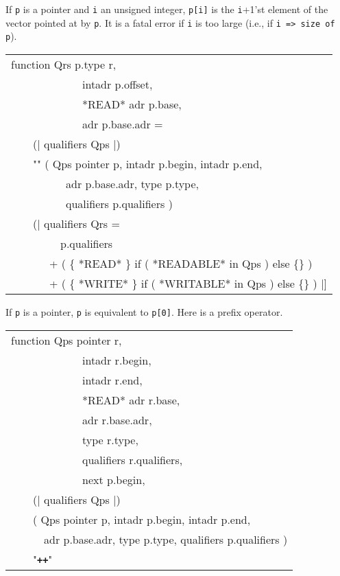 \documentclass[12pt]{article}
\makeatletter
\newcommand{\TT}[1]{{\tt \bfseries #1}}
\newcommand{\ttmkey}[2]{\TT{#1}\index{#1@{\tt #1}!#2}}
\newenvironment{indpar}[1][0.3in]%
	{\begin{list}{}%
		     {\setlength{\itemsep}{0in}%
		      \setlength{\topsep}{0in}%
		      \setlength{\parsep}{1ex}%
		      \setlength{\labelwidth}{#1}%
		      \setlength{\leftmargin}{#1}%
		      \addtolength{\leftmargin}{\labelsep}}%
	 \item}%
	{\end{list}}
\makeatother
\begin{document}
\begin{indpar}
\begin{indpar}
If {\tt p} is a pointer and {\tt i} an unsigned integer,
{\tt p[i]} is the {\tt i}+1'st element of the vector pointed at
by {\tt p}.  It is a fatal error if {\tt i} is too large
(i.e., if {\tt i => size of p}).
\end{indpar}

{\tt\begin{tabular}{@{}l}
function Qrs p.type r, \\
~~~~~~~~~~~~~intadr p.offset, \\
~~~~~~~~~~~~~*READ* adr p.base, \\
~~~~~~~~~~~~~adr p.base.adr = \\
~~~~(| qualifiers Qps |) \\
~~~~"\ttmkey{*}{of pointer}"
        ( Qps pointer p, intadr p.begin, intadr p.end, \\
~~~~~~~~~~adr p.base.adr, type p.type, \\
~~~~~~~~~~qualifiers p.qualifiers ) \\
~~~~(| qualifiers Qrs = \\
~~~~~~~~~p.qualifiers \\
~~~~~~~+ ( \{ *READ* \} if ( *READABLE* in Qps ) else \{\} ) \\
~~~~~~~+ ( \{ *WRITE* \} if ( *WRITABLE* in Qps ) else \{\} )  |] \\
\end{tabular}}

\begin{indpar}
If {\tt p} is a pointer, {\tt *p} is equivalent to {\tt p[0]}.
Here {\tt *} is a prefix operator.
\end{indpar}

{\tt\begin{tabular}{@{}l}
function Qps pointer r, \\
~~~~~~~~~~~~~intadr r.begin, \\
~~~~~~~~~~~~~intadr r.end, \\
~~~~~~~~~~~~~*READ* adr r.base, \\
~~~~~~~~~~~~~adr r.base.adr, \\
~~~~~~~~~~~~~type r.type, \\
~~~~~~~~~~~~~qualifiers r.qualifiers, \\
~~~~~~~~~~~~~next p.begin, \\
~~~~(| qualifiers Qps |) \\
~~~~( Qps pointer p, intadr p.begin, intadr p.end, \\
~~~~~~adr p.base.adr, type p.type, qualifiers p.qualifiers ) \\
~~~~"\ttmkey{++}{of pointer}" \\
\end{tabular}}


\end{indpar}
\end{document}

